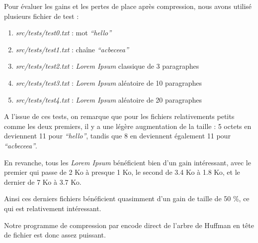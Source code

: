 \documentclass [a4paper,11pt] {report}
\begin{document}
Pour évaluer les gains et les pertes de place après compression, nous avons utilisé plusieurs fichier de test :

\begin{enumerate}

\item%
\textit{src/tests/test0.txt} : mot \textit{``hello''}

\item%
\textit{src/tests/test1.txt} : chaîne \textit{``acbeceea''}

\item%
\textit{src/tests/test2.txt} : \textit{Lorem Ipsum} classique de 3 paragraphes

\item%
\textit{src/tests/test3.txt} : \textit{Lorem Ipsum} aléatoire de 10 paragraphes

\item%
\textit{src/tests/test4.txt} : \textit{Lorem Ipsum} aléatoire de 20 paragraphes

\end{enumerate}


A l'issue de ces tests, on remarque que pour les fichiers relativements petits comme les deux premiers, il y a une légère augmentation de la taille : 5 octets en deviennent 11 pour \textit{``hello''}, tandis que 8 en deviennent également 11 pour \textit{``acbeceea''}.

En revanche, tous les \textit{Lorem Ipsum} bénéficient bien d'un gain intéressant, avec le premier qui passe de 2 Ko à presque 1 Ko, le second de 3.4 Ko à 1.8 Ko, et le dernier de 7 Ko à 3.7 Ko.

Ainsi ces derniers fichiers bénéficient quasimment d'un gain de taille de 50 \%, ce qui est relativement intéressant.

Notre programme de compression par encode direct de l'arbre de Huffman en tête de fichier est donc assez puissant.
\end{document}
